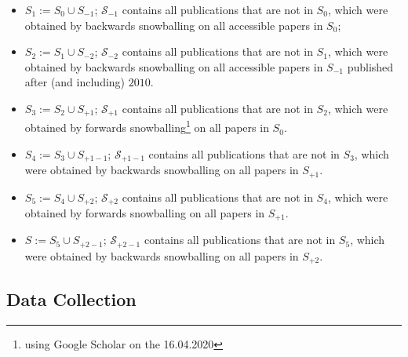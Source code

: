 \documentclass[11pt,a4paper]{book}
\theoremstyle{definition}
\theoremstyle{definition}
\theoremstyle{definition}
\theoremstyle{remark}
\newcommand{\tpsetb}{\mathcal{S}_{\mathit{-1}}}
\newcommand{\tpsetbb}{\mathcal{S}_{\mathit{-2}}}
\newcommand{\tpsetf}{\mathcal{S}_{\mathit{+1}}}
\newcommand{\tpsetff}{\mathcal{S}_{\mathit{+2}}}
\newcommand{\tpsetfb}{\mathcal{S}_{\mathit{+1-1}}}
\newcommand{\tpsetffb}{\mathcal{S}_{\mathit{+2-1}}}
\newcommand{\pset}{S}
\newcommand{\psetz}{S_{\mathit{0}}}
\newcommand{\psetb}{S_{\mathit{-1}}}
\newcommand{\psetbb}{S_{\mathit{-2}}}
\newcommand{\psetf}{S_{\mathit{+1}}}
\newcommand{\psetff}{S_{\mathit{+2}}}
\newcommand{\psetfb}{S_{\mathit{+1-1}}}
\newcommand{\psetffb}{S_{\mathit{+2-1}}}
\begin{document}
\begin{itemize}
\item $\pset_1:= \psetz \cup \psetb$; $\tpsetb$ contains all publications that are not in $\psetz$, which were obtained by backwards snowballing on all accessible papers in $\psetz$; 
\item $\pset_2:= \pset_1 \cup \psetbb$; $\tpsetbb$ contains all publications that are not in $\pset_1$, which were obtained by backwards snowballing on all accessible papers in $\psetb$ published after (and including) $2010$.
\item $\pset_3:= \pset_2 \cup \psetf$; $\tpsetf$ contains all publications that are not in $\pset_2$, which were obtained by forwards snowballing\footnote{using Google Scholar on the 16.04.2020} on all papers in $\psetz$.
\item $\pset_4:= \pset_3 \cup \psetfb$; $\tpsetfb$ contains all publications that are not in $\pset_3$, which were obtained by backwards snowballing on all papers in $\psetf$.
\item $\pset_5:= \pset_4 \cup \psetff$; $\tpsetff$ contains all publications that are not in $\pset_4$, which were obtained by forwards snowballing on all papers in $\psetf$.
\item $\pset:= \pset_5 \cup \psetffb$; $\tpsetffb$ contains all publications that are not in $\pset_5$, which were obtained by backwards snowballing on all papers in $\psetff$.
\end{itemize}


\subsection{Data Collection}
\end{document}
